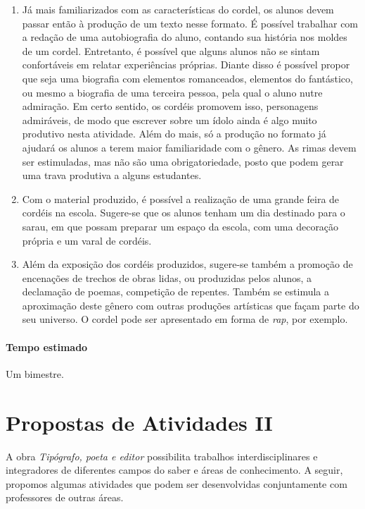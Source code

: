 \documentclass[12pt]{extarticle}
\begin{document}
\begin{enumerate}

\item Já mais familiarizados com as características do cordel, os alunos devem
  passar então à produção de um texto nesse formato. É possível trabalhar com
  a redação de uma autobiografia do aluno, contando sua história nos moldes de
  um cordel. Entretanto, é possível que alguns alunos não se sintam
  confortáveis em relatar experiências próprias.  Diante disso é possível
  propor que seja uma biografia com elementos romanceados, elementos do
  fantástico, ou mesmo a biografia de uma terceira pessoa, pela qual o aluno
  nutre admiração. Em certo sentido, os cordéis promovem isso, personagens
  admiráveis, de modo que escrever sobre um ídolo ainda é algo muito produtivo
  nesta atividade. Além do mais, só a produção no formato já ajudará os alunos
  a terem maior familiaridade com o gênero. As rimas devem ser estimuladas, mas
  não são uma obrigatoriedade, posto que podem gerar uma trava produtiva
  a alguns estudantes.

\item Com o material produzido, é possível a realização de uma grande feira de
  cordéis na escola.  Sugere-se que os alunos tenham um dia destinado para
  o sarau, em que possam preparar um espaço da escola, com uma decoração
  própria e um varal de cordéis.

\item Além da exposição dos cordéis produzidos, sugere-se também a promoção de
  encenações de trechos de obras lidas, ou produzidas pelos alunos,
  a declamação de poemas, competição de repentes. Também se estimula
  a aproximação deste gênero com outras produções artísticas que façam parte do
  seu universo. O cordel pode ser apresentado em forma de \emph{rap}, por
  exemplo.

\end{enumerate}

\paragraph{Tempo estimado} Um bimestre.


\section{Propostas de Atividades II}

A obra \emph{Tipógrafo, poeta e editor} possibilita trabalhos
interdisciplinares e integradores de diferentes campos do saber e áreas de
conhecimento. A seguir, propomos algumas atividades que podem ser desenvolvidas
conjuntamente com professores de outras áreas.
\end{document}
